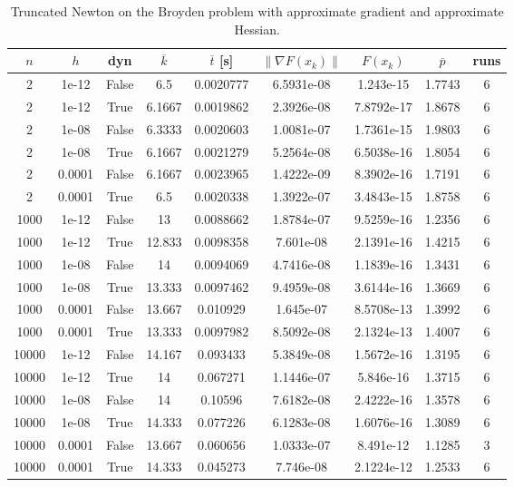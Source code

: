 \begin{table}
\caption{Truncated Newton on the Broyden problem with approximate gradient and approximate Hessian.}
\label{tab:tn_broyden_all_aprox}
\begin{tabular}{ccccccccc}
\toprule
$n$ & $h$ & dyn & $\overline{k}$ & $\overline{t}$ [s] & $\|\nabla F(x_k)\|$ & $F(x_k)$ & $\overline{p}$ & runs \\
\midrule
2 & 1e-12 & False & 6.5 & 0.0020777 & 6.5931e-08 & 1.243e-15 & 1.7743 & 6 \\
2 & 1e-12 & True & 6.1667 & 0.0019862 & 2.3926e-08 & 7.8792e-17 & 1.8678 & 6 \\
2 & 1e-08 & False & 6.3333 & 0.0020603 & 1.0081e-07 & 1.7361e-15 & 1.9803 & 6 \\
2 & 1e-08 & True & 6.1667 & 0.0021279 & 5.2564e-08 & 6.5038e-16 & 1.8054 & 6 \\
2 & 0.0001 & False & 6.1667 & 0.0023965 & 1.4222e-09 & 8.3902e-16 & 1.7191 & 6 \\
2 & 0.0001 & True & 6.5 & 0.0020338 & 1.3922e-07 & 3.4843e-15 & 1.8758 & 6 \\
1000 & 1e-12 & False & 13 & 0.0088662 & 1.8784e-07 & 9.5259e-16 & 1.2356 & 6 \\
1000 & 1e-12 & True & 12.833 & 0.0098358 & 7.601e-08 & 2.1391e-16 & 1.4215 & 6 \\
1000 & 1e-08 & False & 14 & 0.0094069 & 4.7416e-08 & 1.1839e-16 & 1.3431 & 6 \\
1000 & 1e-08 & True & 13.333 & 0.0097462 & 9.4959e-08 & 3.6144e-16 & 1.3669 & 6 \\
1000 & 0.0001 & False & 13.667 & 0.010929 & 1.645e-07 & 8.5708e-13 & 1.3992 & 6 \\
1000 & 0.0001 & True & 13.333 & 0.0097982 & 8.5092e-08 & 2.1324e-13 & 1.4007 & 6 \\
10000 & 1e-12 & False & 14.167 & 0.093433 & 5.3849e-08 & 1.5672e-16 & 1.3195 & 6 \\
10000 & 1e-12 & True & 14 & 0.067271 & 1.1446e-07 & 5.846e-16 & 1.3715 & 6 \\
10000 & 1e-08 & False & 14 & 0.10596 & 7.6182e-08 & 2.4222e-16 & 1.3578 & 6 \\
10000 & 1e-08 & True & 14.333 & 0.077226 & 6.1283e-08 & 1.6076e-16 & 1.3089 & 6 \\
10000 & 0.0001 & False & 13.667 & 0.060656 & 1.0333e-07 & 8.491e-12 & 1.1285 & 3 \\
10000 & 0.0001 & True & 14.333 & 0.045273 & 7.746e-08 & 2.1224e-12 & 1.2533 & 6 \\

\end{tabular}
\end{table}

